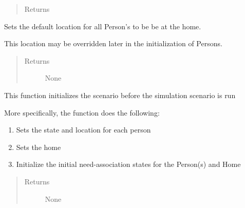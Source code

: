 \documentclass[letterpaper,10pt,english]{sphinxmanual}
\begin{document}
\begin{fulllineitems}
\begin{fulllineitems}
\begin{enumerate}
\end{enumerate}
\begin{quote}\begin{description}
\item[{Returns}] \leavevmode


\end{description}\end{quote}

\end{fulllineitems}


\begin{fulllineitems}
\label{scenario:scenario.Scenario.default_location}
Sets the default location for all Person's to be be at the home.

This location may be overridden later in the initialization of Persons.
\begin{quote}\begin{description}
\item[{Returns}] \leavevmode
None

\end{description}\end{quote}

\end{fulllineitems}


\begin{fulllineitems}
\label{scenario:scenario.Scenario.initialize}
This function initializes the scenario before the simulation scenario is run

More specifically, the function does the following:
\begin{enumerate}
\item {} 
Sets the state and location for each person

\item {} 
Sets the home

\item {} 
Initialize the initial need-association states for the Person(s) and Home

\end{enumerate}
\begin{quote}\begin{description}
\item[{Returns}] \leavevmode
None


\end{description}
\end{quote}
\end{fulllineitems}
\end{fulllineitems}
\end{document}
